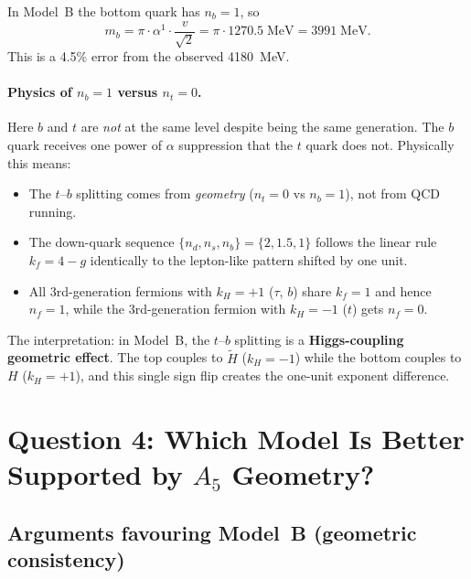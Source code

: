 \documentclass[11pt]{article}
\begin{document}
In Model~B the bottom quark has $n_b=1$, so
\[
  m_b = \pi \cdot \alpha^1 \cdot \frac{v}{\sqrt{2}}
      = \pi \cdot 1270.5\;\mathrm{MeV}
      = 3991\;\mathrm{MeV}.
\]
This is a 4.5\% error from the observed 4180~MeV.

\paragraph{Physics of $n_b=1$ versus $n_t=0$.}
Here $b$ and $t$ are \emph{not} at the same level despite being the same
generation.  The $b$ quark receives one power of $\alpha$ suppression that
the $t$ quark does not.  Physically this means:
\begin{itemize}
  \item The $t$--$b$ splitting comes from \emph{geometry} ($n_t=0$ vs
    $n_b=1$), not from QCD running.
  \item The down-quark sequence $\{n_d, n_s, n_b\} = \{2, 1.5, 1\}$
    follows the linear rule $k_f = 4-g$ identically to the lepton-like
    pattern shifted by one unit.
  \item All 3rd-generation fermions with $k_H=+1$ ($\tau$, $b$) share
    $k_f=1$ and hence $n_f=1$, while the 3rd-generation fermion with
    $k_H=-1$ ($t$) gets $n_f=0$.
\end{itemize}

The interpretation: in Model~B, the $t$--$b$ splitting is a
\textbf{Higgs-coupling geometric effect}.  The top couples to
$\tilde{H}$ ($k_H=-1$) while the bottom couples to $H$ ($k_H=+1$),
and this single sign flip creates the one-unit exponent difference.

\section{Question 4: Which Model Is Better Supported by $A_5$ Geometry?}

\subsection{Arguments favouring Model~B (geometric consistency)}
\end{document}
